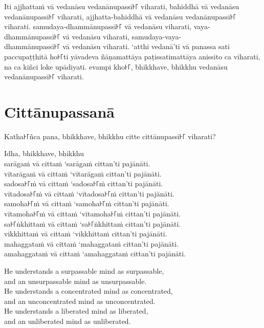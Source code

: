 \paliPage

Iti ajjhattaṁ vā vedanāsu vedanānupassī꜔꜒ viharati, bahiddhā vā vedanāsu
vedanānupassī꜔꜒ viharati, ajjhatta-bahiddhā vā vedanāsu vedanānupassī꜔꜒ viharati.
samudaya-dhammānupassī꜔꜒ vā vedanāsu viharati, vaya-dhammānupassī꜔꜒ vā vedanāsu
viharati, samudaya-vaya-\\
dhammānupassī꜔꜒ vā vedanāsu viharati. ‘atthi vedanā’ti vā panassa sati
paccupaṭṭhitā ho꜔꜒ti yāvadeva ñāṇamattāya paṭissatimattāya anissito ca viharati,
na ca kiñci loke upādiyati. evampi kho꜔꜒, bhikkhave, bhikkhu vedanāsu
vedanānupassī꜔꜒ viharati.


\chapter*{Cittānupassanā}

Katha꜔꜒ñca pana, bhikkhave, bhikkhu citte cittānupassī꜔꜒ viharati?

Idha, bhikkhave, bhikkhu\\
sarāgaṁ vā cittaṁ ‘sarāgaṁ cittan’ti pajānāti.\\
vītarāgaṁ vā cittaṁ ‘vītarāgaṁ cittan’ti pajānāti.\\
sadosa꜔꜒ṁ vā cittaṁ ‘sadosa꜔꜒ṁ cittan’ti pajānāti.\\
vītadosa꜔꜒ṁ vā cittaṁ ‘vītadosa꜔꜒ṁ cittan’ti pajānāti.\\
samoha꜔꜒ṁ vā cittaṁ ‘samoha꜔꜒ṁ cittan’ti pajānāti.\\
vītamoha꜔꜒ṁ vā cittaṁ ‘vītamoha꜔꜒ṁ cittan’ti pajānāti.\\
sa꜔꜒ṅkhittaṁ vā cittaṁ ‘sa꜔꜒ṅkhittaṁ cittan’ti pajānāti.\\
vikkhittaṁ vā cittaṁ ‘vikkhittaṁ cittan’ti pajānāti.\\
mahaggataṁ vā cittaṁ ‘mahaggataṁ cittan’ti pajānāti.\\
amahaggataṁ vā cittaṁ ‘amahaggataṁ cittan’ti pajānāti.

\englishPage

He understands a surpassable mind as surpassable,\\
and an unsurpassable mind as unsurpassable.\\
He understands a concentrated mind as concentrated,\\
and an unconcentrated mind as unconcentrated.\\
He understands a liberated mind as liberated,\\
and an unliberated mind as unliberated.

